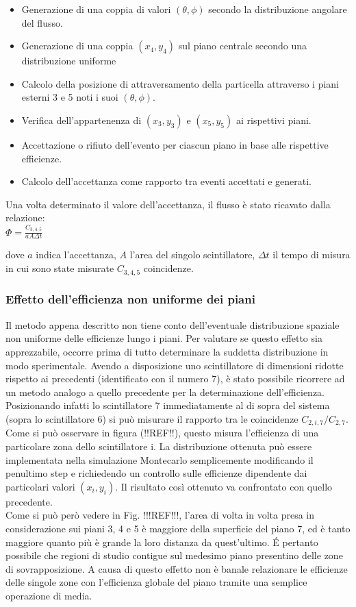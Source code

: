\documentclass[11pt]{article}
\begin{document}
\begin{itemize}
\item{Generazione di una coppia di valori $(\theta,\phi)$ secondo la distribuzione angolare del flusso.}\\
\item{Generazione di una coppia $(x_{4},y_{4})$ sul piano centrale secondo una distribuzione uniforme}\\
\item{Calcolo della posizione di attraversamento della particella attraverso i piani esterni 3 e 5 noti i suoi $(\theta,\phi)$.}
\item{Verifica dell'appartenenza di $(x_{3},y_{3})$ e $(x_{5},y_{5})$ ai rispettivi piani.}
\item{Accettazione o rifiuto dell'evento per ciascun piano in base alle rispettive efficienze.}
\item{Calcolo dell'accettanza come rapporto tra eventi accettati e generati.}
\end{itemize}

Una volta determinato il valore dell'accettanza, il flusso è stato ricavato dalla relazione: \\
$
\Phi = \frac{C_{3,4,5}}{a A \Delta t}
$

dove $a$ indica l'accettanza, $A$ l'area del singolo scintillatore, $\Delta t$ il tempo di misura in cui sono state misurate $C_{3,4,5}$ coincidenze.

\subsubsection{Effetto dell'efficienza non uniforme dei piani}
Il metodo appena descritto non tiene conto dell'eventuale distribuzione spaziale non uniforme delle efficienze lungo i piani. Per valutare se questo effetto sia apprezzabile, occorre prima di tutto determinare la suddetta distribuzione in modo sperimentale. Avendo a disposizione uno scintillatore di dimensioni ridotte rispetto ai precedenti (identificato con il numero 7), è stato possibile ricorrere ad un metodo analogo a quello precedente per la determinazione dell'efficienza. Posizionando infatti lo scintillatore 7 immediatamente al di sopra del sistema (sopra lo scintillatore 6) si può misurare il rapporto tra le coincidenze $C_{2,i,7}/C_{2,7}$. Come si può osservare in figura (!!REF!!), questo misura l'efficienza di una particolare zona dello scintillatore i. La distribuzione ottenuta può essere implementata nella simulazione Montecarlo semplicemente modificando il penultimo step e richiedendo un controllo sulle efficienze dipendente dai particolari valori $(x_i,y_i)$. Il risultato così ottenuto va confrontato con quello precedente.\\
Come si può però vedere in Fig. !!!REF!!!, l'area di volta in volta presa in considerazione sui piani 3, 4 e 5 è maggiore della superficie del piano 7, ed è tanto maggiore quanto più è grande la loro distanza da quest'ultimo. \'E pertanto possibile che regioni di studio contigue sul medesimo piano presentino delle zone di sovrapposizione. A causa di questo effetto non è banale relazionare le efficienze delle singole zone con l'efficienza globale del piano tramite una semplice operazione di media.
\end{document}
